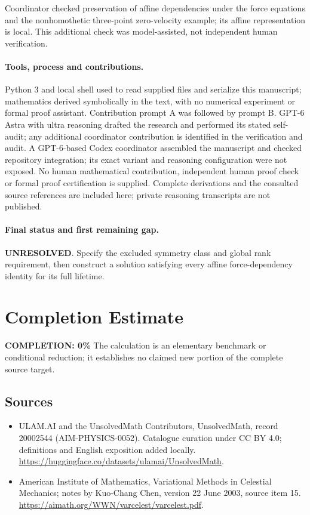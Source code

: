 \documentclass[11pt]{article}
\begin{document}
Coordinator checked preservation of affine dependencies under the force equations and the nonhomothetic three-point zero-velocity example; its affine representation is local. This additional check was model-assisted, not independent human verification.

\paragraph{Tools, process and contributions.}
Python 3 and local shell used to read supplied files and serialize this manuscript; mathematics derived symbolically in the text, with no numerical experiment or formal proof assistant. Contribution prompt A was followed by prompt B. GPT-6 Astra with ultra reasoning drafted the research and performed its stated self-audit; any additional coordinator contribution is identified in the verification and audit. A GPT-6-based Codex coordinator assembled the manuscript and checked repository integration; its exact variant and reasoning configuration were not exposed. No human mathematical contribution, independent human proof check or formal proof certification is supplied. Complete derivations and the consulted source references are included here; private reasoning transcripts are not published.

\paragraph{Final status and first remaining gap.}
\textbf{UNRESOLVED}. Specify the excluded symmetry class and global rank requirement, then construct a solution satisfying every affine force-dependency identity for its full lifetime.

\section{Completion Estimate}
\noindent\textbf{COMPLETION: 0\%}
The calculation is an elementary benchmark or conditional reduction; it establishes no claimed new portion of the complete source target.

\subsection{Sources}
\begin{itemize}
\item[\hypertarget{source:20002544:1}{S1}] ULAM.AI and the UnsolvedMath Contributors, UnsolvedMath, record 20002544 (AIM-PHYSICS-0052). Catalogue curation under CC BY 4.0; definitions and English exposition added locally.
\url{https://huggingface.co/datasets/ulamai/UnsolvedMath}.
\item[\hypertarget{source:20002544:2}{S2}] American Institute of Mathematics, Variational Methods in Celestial Mechanics; notes by Kuo-Chang Chen, version 22 June 2003, source item 15.
\url{https://aimath.org/WWN/varcelest/varcelest.pdf}.
\end{itemize}
\label{end:20002544}
\end{document}
